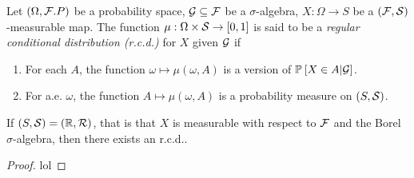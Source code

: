 \begin{defi}
    Let $\left(\Omega, \mathcal{F}. P\right)$ be a probability space, $\mathcal{G} \subseteq \mathcal{F}$ be a $\sigma$-algebra, $X: \Omega \rightarrow S$ be a $(\mathcal{F}, \mathcal{S})$-measurable map. The function $\mu: \Omega \times \mathcal{S} \rightarrow [0, 1]$ is said to be a {\it regular conditional distribution (r.c.d.)} for $X$ given $\mathcal{G}$ if
    \begin{enumerate}[label=(\roman*)]
        \item For each $A$, the function $\omega \mapsto \mu(\omega, A)$ is a version of ${\mathbb P}_{}\left[X \in A | \mathcal{G}\right]$.
        \item For a.e. $\omega$, the function $A \mapsto \mu(\omega, A)$ is a probability measure on $(S, \mathcal{S})$.
    \end{enumerate}
\end{defi}

\begin{thm}
    If $(S, \mathcal{S}) = (\mathbb{R}, \mathcal{R})$, that is that $X$ is measurable with respect to $\mathcal{F}$ and the Borel $\sigma$-algebra, then there exists an r.c.d..
\end{thm}
\begin{proof}
    lol
\end{proof}




